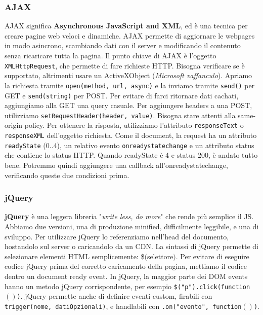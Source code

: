 \documentclass[11pt]{article}
\newcommand{\code}[1]{\texttt{#1}}
\begin{document}
\subsubsection{AJAX}
AJAX significa \textbf{Asynchronous JavaScript and XML}, ed è una tecnica per creare pagine web veloci e dinamiche. AJAX permette di aggiornare le webpages in modo asincrono, scambiando dati con il server e modificando il contenuto senza ricaricare tutta la pagina. Il punto chiave di AJAX è l'oggetto \code{XMLHttpRequest}, che permette di fare richieste HTTP. Bisogna verificare se è supportato, altrimenti usare un ActiveXObject (\textit{Microsoft vaffanculo}). Apriamo la richiesta tramite \code{open(method, url, async)} e la inviamo tramite \code{send()} per GET e \code{send(string)} per POST. Per evitare di farci ritornare dati cachati, aggiungiamo alla GET una query casuale. Per aggiungere headers a una POST, utilizziamo \code{setRequestHeader(header, value)}. Bisogna stare attenti alla same-origin policy. Per ottenere la risposta, utilizziamo l'attributo \code{responseText} o \code{responseXML} dell'oggetto richiesta. Come il document, la request ha un attributo \code{readyState} (0..4), un relativo evento \code{onreadystatechange} e un attributo status che contiene lo status HTTP. Quando readyState è 4 e status 200, è andato tutto bene. Potremmo quindi aggiungere una callback all'onreadystatechange, verificando queste due condizioni prima.

\subsubsection{jQuery}
\textbf{jQuery} è una leggera libreria "\textit{write less, do more}" che rende più semplice il JS. Abbiamo due versioni, una di produzione minified, difficilmente leggibile, e una di sviluppo. Per utilizzare jQuery lo referenziamo nell'head del documento, hostandolo sul server o caricandolo da un CDN. La sintassi di jQuery permette di selezionare elementi HTML semplicemente: \$$($selettore$)$. Per evitare di eseguire codice jQuery prima del corretto caricamento della pagina, mettiamo il codice dentro un document ready event. In jQuery, la maggior parte dei DOM events hanno un metodo jQuery corrispondente, per esempio \code{\$("p").click(function$(){}$)}. jQuery permette anche di definire eventi custom, firabili con \code{trigger(nome, datiOpzionali)}, e handlabili con \code{.on("evento", function$(){}$)}. 
\end{document}
